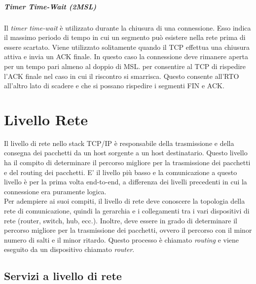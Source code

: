 \documentclass[12pt]{report}
\begin{document}
	\paragraph{Timer Time-Wait (2MSL)}
	Il \textit{timer time-wait} è utilizzato durante la chiusura di una connessione. Esso indica il massimo periodo di tempo in cui un segmento può esistere nella rete prima di essere scartato. Viene utilizzato solitamente quando il TCP effettua una chiusura attiva e invia un ACK finale. In questo caso la connessione deve rimanere aperta per un tempo pari almeno al doppio di MSL.
	per consentire al TCP di rispedire l'ACK finale nel caso in cui il riscontro si smarrisca. Questo consente all'RTO all'altro lato di scadere e che si possano rispedire i segmenti FIN e ACK.


	\chapter{Livello Rete}
	Il livello di rete nello stack TCP/IP è responsabile della trasmissione e della consegna dei pacchetti da un host sorgente a un host destinatario. Questo livello ha il compito di determinare il percorso migliore per la trasmissione dei pacchetti e del routing dei pacchetti. E' il livello più basso e la comunicazione a questo livello è per la prima volta end-to-end, a differenza dei livelli precedenti in cui la connessione era puramente logica.
	\vspace{\baselineskip}\\
	Per adempiere ai suoi compiti, il livello di rete deve conoscere la topologia della rete di comunicazione, quindi la gerarchia e i collegamenti tra i vari dispositivi di rete (router, switch, hub, ecc.). Inoltre, deve essere in grado di determinare il percorso migliore per la trasmissione dei pacchetti, ovvero il percorso con il minor numero di salti e il minor ritardo. Questo processo è chiamato \textit{routing} e viene eseguito da un dispositivo chiamato \textit{router}.

	\section{Servizi a livello di rete}
\end{document}
